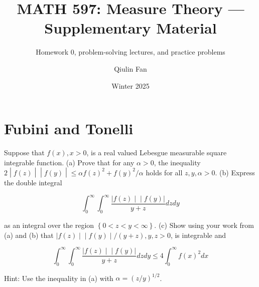 \documentclass{qlnotes-export}
\title{MATH 597: Measure Theory --- Supplementary Material}
\subtitle{Homework 0, problem-solving lectures, and practice problems}
\author{Qiulin Fan}
\date{Winter 2025}
\begin{document}
\mainmatter
\chapter{Fubini and Tonelli}\label{fubini-and-tonelli}

Suppose that \(f(x),x > 0\), is a real valued Lebesgue measurable square integrable function. (a) Prove that for any \(\alpha > 0\), the inequality \(\left. 2 \middle| f(z) \middle| \middle| f(y) \middle| \leq \alpha f(z)^{2} + f(y)^{2}/\alpha \right.\) holds for all \(z,y,\alpha > 0\). (b) Express the double integral

\[\int_{0}^{\infty}\int_{0}^{\infty}\frac{\left. |f(z) \middle| \middle| f(y)| \right.}{y + z}dzdy\]

as an integral over the region \(\left\{ {0 < z < y < \infty} \right\}\). (c) Show using your work from (a) and (b) that \(\left. |f(z) \middle| \middle| f(y) \middle| /(y + z),y,z > 0 \right.\), is integrable and

\[\int_{0}^{\infty}\int_{0}^{\infty}\frac{\left. |f(z) \middle| \middle| f(y)| \right.}{y + z}dzdy \leq 4\int_{0}^{\infty}f(x)^{2}dx\]

Hint: Use the inequality in (a) with \(\alpha = (z/y)^{1/2}\).
\end{document}
